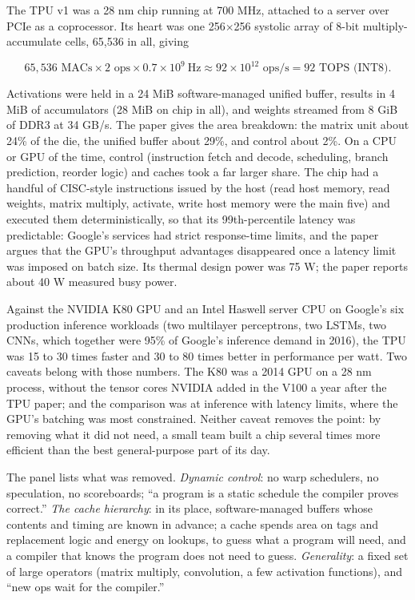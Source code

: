 \documentclass[11pt,letterpaper]{article}
\newenvironment{formulas}{\begin{tcolorbox}[formulabox]}{\end{tcolorbox}}
\begin{document}
The TPU v1 was a 28 nm chip running at 700 MHz, attached to a server over PCIe as a coprocessor. Its heart was one 256$\times$256 systolic array of 8-bit multiply-accumulate cells, 65{,}536 in all, giving
\begin{formulas}
\[ 65{,}536 \text{ MACs} \times 2 \text{ ops} \times 0.7\times10^{9}\ \text{Hz} \approx 92\times10^{12} \text{ ops/s} = 92 \text{ TOPS (INT8)}. \]
\end{formulas}
Activations were held in a 24 MiB software-managed unified buffer, results in 4 MiB of accumulators (28 MiB on chip in all), and weights streamed from 8 GiB of DDR3 at 34 GB/s. The paper gives the area breakdown: the matrix unit about 24\% of the die, the unified buffer about 29\%, and control about 2\%. On a CPU or GPU of the time, control (instruction fetch and decode, scheduling, branch prediction, reorder logic) and caches took a far larger share. The chip had a handful of CISC-style instructions issued by the host (read host memory, read weights, matrix multiply, activate, write host memory were the main five) and executed them deterministically, so that its 99th-percentile latency was predictable: Google's services had strict response-time limits, and the paper argues that the GPU's throughput advantages disappeared once a latency limit was imposed on batch size. Its thermal design power was 75 W; the paper reports about 40 W measured busy power.

Against the NVIDIA K80 GPU and an Intel Haswell server CPU on Google's six production inference workloads (two multilayer perceptrons, two LSTMs, two CNNs, which together were 95\% of Google's inference demand in 2016), the TPU was 15 to 30 times faster and 30 to 80 times better in performance per watt. Two caveats belong with those numbers. The K80 was a 2014 GPU on a 28 nm process, without the tensor cores NVIDIA added in the V100 a year after the TPU paper; and the comparison was at inference with latency limits, where the GPU's batching was most constrained. Neither caveat removes the point: by removing what it did not need, a small team built a chip several times more efficient than the best general-purpose part of its day.

The panel lists what was removed. \emph{Dynamic control}: no warp schedulers, no speculation, no scoreboards; ``a program is a static schedule the compiler proves correct.'' \emph{The cache hierarchy}: in its place, software-managed buffers whose contents and timing are known in advance; a cache spends area on tags and replacement logic and energy on lookups, to guess what a program will need, and a compiler that knows the program does not need to guess. \emph{Generality}: a fixed set of large operators (matrix multiply, convolution, a few activation functions), and ``new ops wait for the compiler.''
\end{document}
